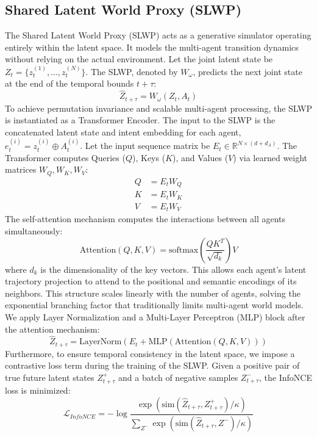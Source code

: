 \documentclass[conference]{IEEEtran}
\begin{document}
\subsection{Shared Latent World Proxy (SLWP)}
The Shared Latent World Proxy (SLWP) acts as a generative simulator operating entirely within the latent space. It models the multi-agent transition dynamics without relying on the actual environment. Let the joint latent state be $Z_t = \{z_t^{(1)}, \dots, z_t^{(N)}\}$. The SLWP, denoted by $W_\omega$, predicts the next joint state at the end of the temporal bounds $t+\tau$:
\begin{equation}
\hat{Z}_{t+\tau} = W_\omega(Z_t, A_t)
\end{equation}
To achieve permutation invariance and scalable multi-agent processing, the SLWP is instantiated as a Transformer Encoder. The input to the SLWP is the concatenated latent state and intent embedding for each agent, $e_t^{(i)} = z_t^{(i)} \oplus A_t^{(i)}$. Let the input sequence matrix be $E_t \in \mathbb{R}^{N \times (d+d_A)}$. The Transformer computes Queries ($Q$), Keys ($K$), and Values ($V$) via learned weight matrices $W_Q, W_K, W_V$:
\begin{align}
Q &= E_t W_Q \\
K &= E_t W_K \\
V &= E_t W_V 
\end{align}
The self-attention mechanism computes the interactions between all agents simultaneously:
\begin{equation}
\text{Attention}(Q, K, V) = \text{softmax}\left(\frac{Q K^T}{\sqrt{d_k}}\right) V
\end{equation}
where $d_k$ is the dimensionality of the key vectors. This allows each agent's latent trajectory projection to attend to the positional and semantic encodings of its neighbors. This structure scales linearly with the number of agents, solving the exponential branching factor that traditionally limits multi-agent world models. We apply Layer Normalization and a Multi-Layer Perceptron (MLP) block after the attention mechanism:
\begin{equation}
\hat{Z}_{t+\tau} = \text{LayerNorm}(E_t + \text{MLP}(\text{Attention}(Q, K, V)))
\end{equation}
Furthermore, to ensure temporal consistency in the latent space, we impose a contrastive loss term during the training of the SLWP. Given a positive pair of true future latent states $Z_{t+\tau}^+$ and a batch of negative samples $Z_{t+\tau}^-$, the InfoNCE loss is minimized:
\begin{equation}
\mathcal{L}_{InfoNCE} = - \log \frac{\exp(\text{sim}(\hat{Z}_{t+\tau}, Z_{t+\tau}^+) / \kappa)}{\sum_{Z^-} \exp(\text{sim}(\hat{Z}_{t+\tau}, Z^-) / \kappa)}
\end{equation}
\end{document}

